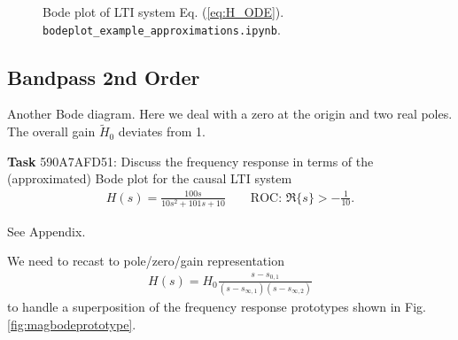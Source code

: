 \documentclass[11pt,a4paper,DIV=12]{scrartcl}
\numberwithin{equation}{section}
\numberwithin{figure}{section}
\newcommand{\eq}[1]{Eq. (\ref{#1})} %
\newcommand{\fig}[1]{Fig. \ref{#1}} %
\begin{document}
\begin{figure}[h!]
\centering
{}

\caption{Bode plot of LTI system \eq{eq:H_ODE}.
\texttt{bodeplot\_example\_approximations.ipynb}.}
\label{fig:bodeplot_example_approximations_44EB4169E9}
\end{figure}





\clearpage
\subsection{Bandpass 2nd Order}
\label{sec:590A7AFD51}
\begin{Ziel}
Another Bode diagram. Here we deal with a zero at the origin and two real
poles. The overall gain $\tilde{H}_0$ deviates from 1.
\end{Ziel}
\textbf{Task} {\tiny 590A7AFD51}: Discuss the frequency response in terms
of the (approximated) Bode plot for the causal LTI system
\begin{align}
H(s) = \frac{100 s}{10 s^2 + 101 s + 10}\qquad\text{ROC: }
\Re\{s\}>-\frac{1}{10}.
\end{align}
\begin{Werkzeug}
See Appendix.
\end{Werkzeug}
\begin{Ansatz}
We need to recast to pole/zero/gain representation
\begin{align}
H(s) = H_0\frac{s-s_{0,1}}{(s-s_{\infty,1})(s-s_{\infty,2})}
\end{align}
to handle a superposition of the frequency response prototypes shown in
\fig{fig:magbodeprototype}.
\end{Ansatz}
\end{document}
